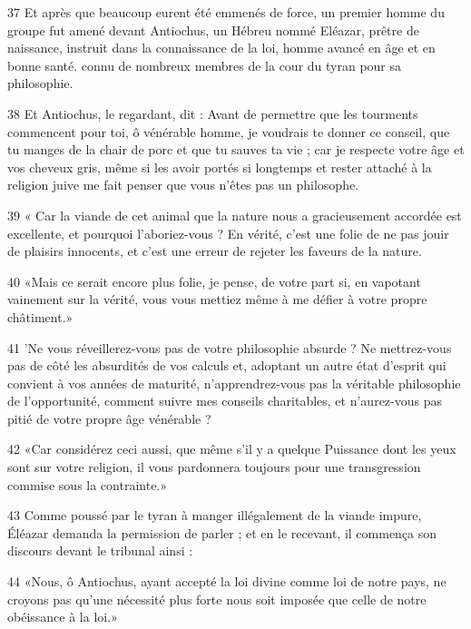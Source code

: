 \par 37 Et après que beaucoup eurent été emmenés de force, un premier homme du groupe fut amené devant Antiochus, un Hébreu nommé Eléazar, prêtre de naissance, instruit dans la connaissance de la loi, homme avancé en âge et en bonne santé. connu de nombreux membres de la cour du tyran pour sa philosophie.

\par 38 Et Antiochus, le regardant, dit : Avant de permettre que les tourments commencent pour toi, ô vénérable homme, je voudrais te donner ce conseil, que tu manges de la chair de porc et que tu sauves ta vie ; car je respecte votre âge et vos cheveux gris, même si les avoir portés si longtemps et rester attaché à la religion juive me fait penser que vous n'êtes pas un philosophe.

\par 39 « Car la viande de cet animal que la nature nous a gracieusement accordée est excellente, et pourquoi l'aboriez-vous ? En vérité, c'est une folie de ne pas jouir de plaisirs innocents, et c'est une erreur de rejeter les faveurs de la nature.

\par 40 «Mais ce serait encore plus folie, je pense, de votre part si, en vapotant vainement sur la vérité, vous vous mettiez même à me défier à votre propre châtiment.»

\par 41 'Ne vous réveillerez-vous pas de votre philosophie absurde ? Ne mettrez-vous pas de côté les absurdités de vos calculs et, adoptant un autre état d'esprit qui convient à vos années de maturité, n'apprendrez-vous pas la véritable philosophie de l'opportunité, comment suivre mes conseils charitables, et n'aurez-vous pas pitié de votre propre âge vénérable ?

\par 42 «Car considérez ceci aussi, que même s'il y a quelque Puissance dont les yeux sont sur votre religion, il vous pardonnera toujours pour une transgression commise sous la contrainte.»

\par 43 Comme poussé par le tyran à manger illégalement de la viande impure, Éléazar demanda la permission de parler ; et en le recevant, il commença son discours devant le tribunal ainsi :

\par 44 «Nous, ô Antiochus, ayant accepté la loi divine comme loi de notre pays, ne croyons pas qu'une nécessité plus forte nous soit imposée que celle de notre obéissance à la loi.»

